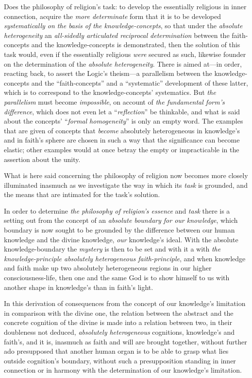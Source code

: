 \documentclass[12pt,a4paper]{book}
\begin{document}
Does the philosophy of religion's task: to develop the essentially religious in inner connection, acquire the
\emph{more determinate} form that it is to be developed \emph{systematically on the basis of the knowledge-concepts}, so
that under the \emph{absolute heterogeneity} an \emph{all-sidedly articulated reciprocal determination} between the
faith-concepts and the knowledge-concepts is demonstrated, then the solution of this task would, even if the
essentially religious \emph{were} secured as such, likewise founder on the determination of the \emph{absolute
heterogeneity}. There is aimed at---in order, reacting back, to assert the Logic's theism---a parallelism between
the knowledge-concepts and the ``faith-concepts'' and a ``systematic'' development of these latter, which is to
correspond to the knowledge-concepts' systematics. But \emph{the parallelism} must become \emph{impossible}, on account
of \emph{the fundamental form's difference}, which does not even let a ``\emph{reflection}'' be thinkable, and what is said
about the concepts' ``\emph{formal homogeneity}'' is only an empty word. The examples that are given of concepts that
\emph{become} absolutely heterogeneous in knowledge's and in faith's sphere are chosen in such a way that the
significance can become elastic; other examples would at once betray the empty or impracticable in the assertion
about the unity.

What is here said concerning the philosophy of religion now becomes more closely illuminated inasmuch as we
investigate the way in which its \emph{task} is grounded, and the means that are intimated for the task's solution.

In order to determine \emph{the philosophy of religion's essence} and \emph{task} there is a setting out from the concept of an
\emph{absolute boundary for our knowledge}, which boundary is now sought to be grounded by the difference between
our human knowledge and the divine knowledge, \emph{our} knowledge's ideal. With the absolute knowledge-boundary the
\emph{mystery} is then to be set and with it a with \emph{the knowledge-principle absolutely heterogeneous faith-principle}, and
when knowledge and faith make up two absolutely heterogeneous regions in our higher consciousness-life, then one
and the same God is to show himself to us with another shape in knowledge's than in faith's light.

In this derivation of consequences from the concept of our knowledge's limitation in comparison with the divine
one, the relation between the abstract and the concrete cognition of the divine is made into a relation between
two, in their doubleness not deduced, \emph{absolutely heterogeneous} cognitions, knowledge's and faith's, and it
is, inasmuch as faith and will are brought together, without further ado presupposed that another human organ is
to be able to grasp what lies outside cognition's boundary, without such a presupposition standing in inner
connection or in harmony with the determination of our knowledge's limitation.
\end{document}
